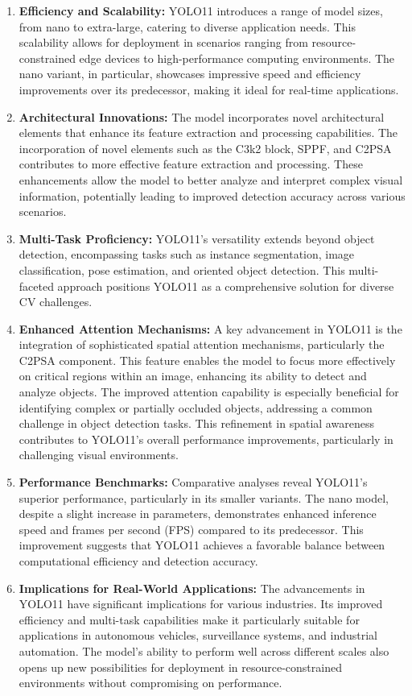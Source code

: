 \documentclass{article}
\begin{document}
\begin{enumerate}
    \item \textbf{Efficiency and Scalability:} YOLO11 introduces a range of model sizes, from nano to extra-large, catering to diverse application needs. This scalability allows for deployment in scenarios ranging from resource-constrained edge devices to high-performance computing environments. The nano variant, in particular, showcases impressive speed and efficiency improvements over its predecessor, making it ideal for real-time applications.
    \item \textbf{Architectural Innovations:} The model incorporates novel architectural elements that enhance its feature extraction and processing capabilities. The incorporation of novel elements such as the C3k2 block, SPPF, and C2PSA contributes to more effective feature extraction and processing. These enhancements allow the model to better analyze and interpret complex visual information, potentially leading to improved detection accuracy across various scenarios.
    \item \textbf{Multi-Task Proficiency:} YOLO11's versatility extends beyond object detection, encompassing tasks such as instance segmentation, image classification, pose estimation, and oriented object detection. This multi-faceted approach positions YOLO11 as a comprehensive solution for diverse CV challenges.
    \item \textbf{Enhanced Attention Mechanisms:} A key advancement in YOLO11 is the integration of sophisticated spatial attention mechanisms, particularly the C2PSA component. This feature enables the model to focus more effectively on critical regions within an image, enhancing its ability to detect and analyze objects. The improved attention capability is especially beneficial for identifying complex or partially occluded objects, addressing a common challenge in object detection tasks. This refinement in spatial awareness contributes to YOLO11's overall performance improvements, particularly in challenging visual environments.
    \item \textbf{Performance Benchmarks:} Comparative analyses reveal YOLO11's superior performance, particularly in its smaller variants. The nano model, despite a slight increase in parameters, demonstrates enhanced inference speed and frames per second (FPS) compared to its predecessor. This improvement suggests that YOLO11 achieves a favorable balance between computational efficiency and detection accuracy.
    \item \textbf{Implications for Real-World Applications:} The advancements in YOLO11 have significant implications for various industries. Its improved efficiency and multi-task capabilities make it particularly suitable for applications in autonomous vehicles, surveillance systems, and industrial automation. The model's ability to perform well across different scales also opens up new possibilities for deployment in resource-constrained environments without compromising on performance.
\end{enumerate}
\end{document}
